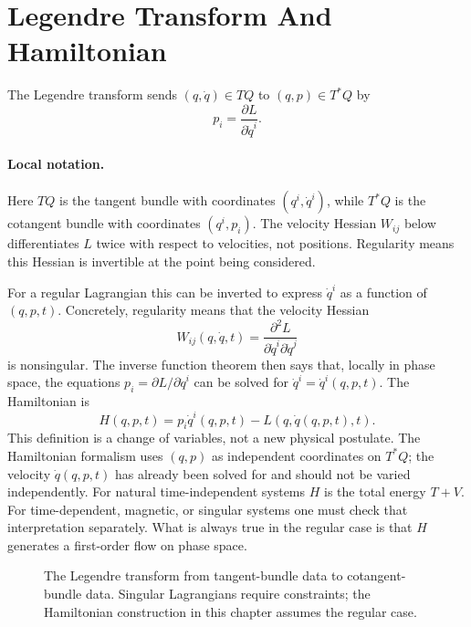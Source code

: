 \section{Legendre Transform And Hamiltonian}
\label{sec:legendre-hamiltonian}

The Legendre transform sends \((q,\dot q)\in TQ\) to \((q,p)\in T^*Q\) by
\[
  p_i=\frac{\partial L}{\partial \dot q^i}.
\]

\paragraph{Local notation.}
Here \(TQ\) is the tangent bundle with coordinates \((q^i,\dot q^i)\), while
\(T^*Q\) is the cotangent bundle with coordinates \((q^i,p_i)\).  The velocity
Hessian \(W_{ij}\) below differentiates \(L\) twice with respect to velocities,
not positions.  Regularity means this Hessian is invertible at the point being
considered.

For a regular Lagrangian this can be inverted to express \(\dot q^i\) as a
function of \((q,p,t)\). Concretely, regularity means that the velocity Hessian
\[
  W_{ij}(q,\dot q,t)=
  \frac{\partial^2L}{\partial\dot q^i\partial\dot q^j}
\]
is nonsingular. The inverse function theorem then says that, locally in phase
space, the equations \(p_i=\partial L/\partial\dot q^i\) can be solved for
\(\dot q^i=\dot q^i(q,p,t)\).
The Hamiltonian is
\[
  H(q,p,t)=p_i\dot q^i(q,p,t)-L(q,\dot q(q,p,t),t).
\]
This definition is a change of variables, not a new physical postulate.  The
Hamiltonian formalism uses \((q,p)\) as independent coordinates on \(T^*Q\);
the velocity \(\dot q(q,p,t)\) has already been solved for and should not be
varied independently.  For natural time-independent systems \(H\) is the total
energy \(T+V\).  For time-dependent, magnetic, or singular systems one must
check that interpretation separately.  What is always true in the regular case
is that \(H\) generates a first-order flow on phase space.

\begin{figure}[htbp]
\centering
{}
\caption{The Legendre transform from tangent-bundle data to cotangent-bundle
data. Singular Lagrangians require constraints; the Hamiltonian construction in
this chapter assumes the regular case.}
\label{fig:legendre-transform}
\end{figure}

